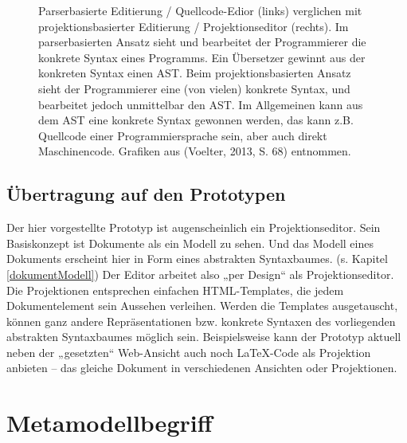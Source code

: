  
\begin{figure}[h!]
\centering
\advance\leftskip-2.5cm
\caption{ Parserbasierte Editierung / Quellcode-Edior (links) verglichen mit projektionsbasierter Editierung / Projektionseditor (rechts). Im parserbasierten Ansatz sieht und bearbeitet der Programmierer die konkrete Syntax eines Programms. Ein Übersetzer gewinnt aus der konkreten Syntax einen AST. Beim projektionsbasierten Ansatz sieht der Programmierer eine (von vielen) konkrete Syntax, und bearbeitet jedoch unmittelbar den AST. Im Allgemeinen kann aus dem AST eine konkrete Syntax gewonnen werden, das kann z.B. Quellcode einer Programmiersprache sein, aber auch direkt Maschinencode. Grafiken aus (Voelter, 2013, S. 68) entnommen. }\label{parserprojectional}
\end{figure}
 
\subsection{Übertragung auf den Prototypen}\label{}
 
Der hier vorgestellte Prototyp ist augenscheinlich ein Projektionseditor. Sein Basiskonzept ist Dokumente als ein Modell zu sehen. Und das Modell eines Dokuments erscheint hier in Form eines abstrakten Syntaxbaumes. (s. Kapitel \ref{dokumentModell}) Der Editor arbeitet also „per Design“ als Projektionseditor. Die Projektionen entsprechen einfachen HTML-Templates, die jedem Dokumentelement sein Aussehen verleihen. Werden die Templates ausgetauscht, können ganz andere Repräsentationen bzw. konkrete Syntaxen des vorliegenden abstrakten Syntaxbaumes möglich sein. Beispielsweise kann der Prototyp aktuell neben der „gesetzten“ Web-Ansicht auch noch LaTeX-Code als Projektion anbieten -- das gleiche Dokument in verschiedenen Ansichten oder Projektionen.

 
\section{Metamodellbegriff}\label{metamodellbegriff-sec}
 
